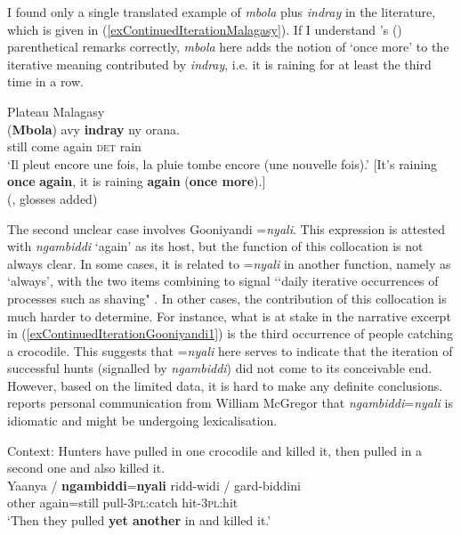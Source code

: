 I found only a single translated example of \textit{mbola} plus \textit{indray} in the literature, which is given in (\ref{exContinuedIterationMalagasy}). If I understand \citeauthor{Dez1980}'s (\citeyear{Dez1980}) parenthetical remarks correctly, \textit{mbola} here adds the notion of \lq once more\rq{ }to the iterative meaning contributed by \textit{indray}, i.e. it is raining for at least the third time in a row.

\begin{exe}
\ex Plateau Malagasy\label{exContinuedIterationMalagasy}\\
\gll \textup{(}\textbf{Mbola}\textup{)} avy \textbf{indray} ny orana.\\
	\phantom{(}still come again \textsc{det} rain\\
	\glt \lq Il pleut encore une fois, la pluie tombe encore (une nouvelle fois).' [It's raining \textbf{once} \textbf{again}, it is raining \textbf{again} (\textbf{once more}).] 	\\(\cite[537]{Dez1980},  glosses added)
\end{exe}

The second unclear case involves Gooniyandi \mbox{=\textit{nyali}}. This expression is attested with \textit{ngambiddi} \lq again' as its host, but the function of this collocation is not always clear. In some cases, it is related to \mbox{=\textit{nyali}} in another function, namely as \lq always\rq{}, with the two items combining to signal \lq\lq daily iterative occurrences of processes such as shaving" \parencite[464]{McGregor1990}. In other cases, the contribution of this collocation is much harder to determine. For instance, what is at stake in the narrative excerpt in (\ref{exContinuedIterationGooniyandi1}) is the third occurrence of people catching a crocodile. This suggests that \mbox{=\textit{nyali}} here serves to indicate that the iteration of successful hunts (signalled by \textit{ngambiddi}) did not come to its conceivable end. However, based on the limited data, it is hard to make any definite conclusions. \textcite[244]{SchultzeBerndt2002} reports personal communication from William McGregor that \textit{ngambiddi}=\mbox{\textit{nyali}} is idiomatic and might be undergoing lexicalisation.
 
\begin{exe}
\ex \label{exContinuedIterationGooniyandi1}
Context: Hunters have pulled in one crocodile and killed it, then pulled in a second one and also killed it.\\
	\gll Yaanya / \textbf{ngambiddi}=\textbf{nyali} ridd-widi / gard-biddini\\
	other {} again=still pull-3\textsc{pl}:catch {} hit-3\textsc{pl}:hit\\
	\glt \lq Then they pulled \textbf{yet another} in and killed it.' \parencite[575]{McGregor1990}
\end{exe}

